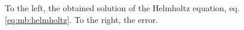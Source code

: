 \begin{figure}
  \centering   
 \hspace{5pt}
\caption{To the left, the obtained solution of the Helmholtz
 equation, eq. \eqref{eq:mb:helmholtz}. To the right, the error.}
\label{traj}
\end{figure}

